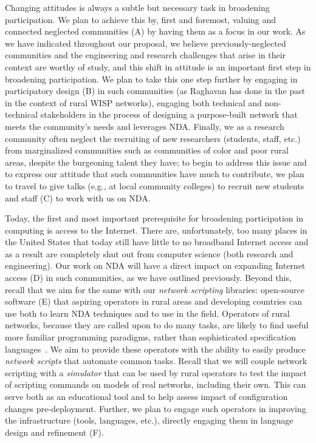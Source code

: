 \documentclass[10pt]{article}
\begin{document}
Changing attitudes is always a subtle but necessary task in broadening participation.  We plan to achieve this by, first and foremost, valuing and connected neglected communities (A) by having them as a focus in our work.  As we have indicated throughout our proposal, we believe previously-neglected communities and the engineering and research challenges that arise in their context are worthy of study, and this shift in attitude is an important first step in broadening participation.  We plan to take this one step further by engaging in participatory design (B) in such communities (as Raghavan has done in the past in the context of rural WISP networks), engaging both technical and non-technical stakeholders in the process of designing a purpose-built network that meets the community's needs and leverages NDA.  Finally, we as a research community often neglect the recruiting of new researchers (students, staff, etc.) from marginalized communities such as communities of color and poor rural areas, despite the burgeoning talent they have; to begin to address this issue and to express our attitude that such communities have much to contribute, we plan to travel to give talks (e.g., at local community colleges) to recruit new students and staff (C) to work with us on NDA.

Today, the first and most important prerequisite for broadening participation in computing is access to the Internet.  There are, unfortunately, too many places in the United States that today still have little to no broadband Internet access and as a result are completely shut out from computer science (both research and engineering).  Our work on NDA will have a direct impact on expanding Internet access (D) in such communities, as we have outlined previously.
Beyond this, recall that we aim for the same with our \emph{network scripting} libraries: open-source software (E) that aspiring operators in rural areas and developing countries can use both to learn NDA techniques and to use in the field.  Operators of rural networks, because they are called upon to do many tasks, are likely to find useful more familiar programming paradigms, rather than sophisticated specification languages~\cite{netkat,propane}.  We aim to provide these operators with the ability to easily produce \emph{network scripts} that automate common tasks.  Recall that we will couple network scripting with a \emph{simulator} that can be used by rural operators to test the impact of scripting commands on models of real networks, including their own. This can serve both as an educational tool and to help assess impact of configuration changes pre-deployment.  Further, we plan to engage such operators in improving the infrastructure (tools, languages, etc.), directly engaging them in language design and refinement (F).
\end{document}
